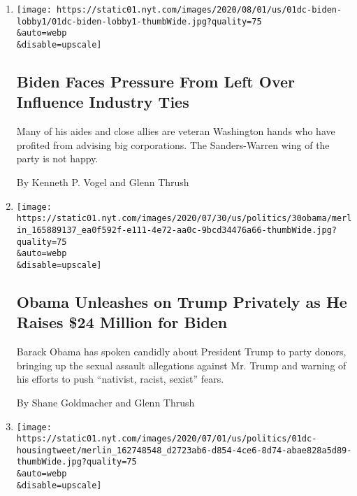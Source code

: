 \begin{enumerate}
\def\labelenumi{\arabic{enumi}.}
\item
  \href{/2020/08/01/us/politics/biden-lobbyist-ties.html}{}

  \texttt{[image: https://static01.nyt.com/images/2020/08/01/us/01dc-biden-lobby1/01dc-biden-lobby1-thumbWide.jpg?quality=75\\\&auto=webp\\\&disable=upscale]}

  \hypertarget{biden-faces-pressure-from-left-over-influence-industry-ties}{%
  \subsection{Biden Faces Pressure From Left Over Influence Industry
  Ties}\label{biden-faces-pressure-from-left-over-influence-industry-ties}}

  Many of his aides and close allies are veteran Washington hands who
  have profited from advising big corporations. The Sanders-Warren wing
  of the party is not happy.

  By Kenneth P. Vogel and Glenn Thrush
\item
  \href{/2020/07/30/us/politics/obama-trump-biden.html}{}

  \texttt{[image: https://static01.nyt.com/images/2020/07/30/us/politics/30obama/merlin\_165889137\_ea0f592f-e111-4e72-aa0c-9bcd34476a66-thumbWide.jpg?quality=75\\\&auto=webp\\\&disable=upscale]}

  \hypertarget{obama-unleashes-on-trump-privately-as-he-raises-24-million-for-biden}{%
  \subsection{Obama Unleashes on Trump Privately as He Raises \$24
  Million for
  Biden}\label{obama-unleashes-on-trump-privately-as-he-raises-24-million-for-biden}}

  Barack Obama has spoken candidly about President Trump to party
  donors, bringing up the sexual assault allegations against Mr. Trump
  and warning of his efforts to push ``nativist, racist, sexist'' fears.

  By Shane Goldmacher and Glenn Thrush
\item
  \href{/2020/07/01/us/politics/trump-obama-housing-discrimination.html}{}

  \texttt{[image: https://static01.nyt.com/images/2020/07/01/us/politics/01dc-housingtweet/merlin\_162748548\_d2723ab6-d854-4ce6-8d74-abae828a5d89-thumbWide.jpg?quality=75\\\&auto=webp\\\&disable=upscale]}


\end{enumerate}
